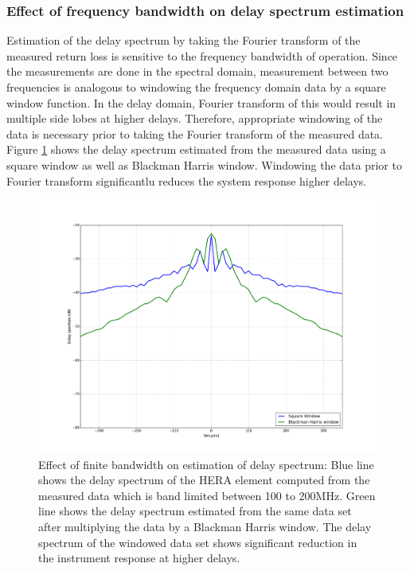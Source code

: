 \documentclass[twocolumn]{emulateapj}
\begin{document}
\subsubsection{Effect of frequency bandwidth on delay spectrum estimation}
Estimation of the delay spectrum by taking the Fourier transform of the measured return loss is sensitive to the frequency bandwidth of operation. Since the measurements are done in the spectral domain, measurement between two frequencies is analogous to windowing the frequency domain data by a square window function. In the delay domain, Fourier transform of this would result in multiple side lobes at higher delays. Therefore, appropriate windowing of the data is  necessary prior to taking the Fourier transform of the measured data. Figure \ref{fig:window} shows the delay spectrum estimated from the measured data using a square window as well as Blackman Harris window. Windowing the data prior to Fourier transform significantlu reduces the system response higher delays.  
\begin{figure}
\centering
\includegraphics[width=\linewidth]{plots/window.png}
\caption{Effect of finite bandwidth on estimation of delay spectrum: Blue line shows the delay spectrum of the HERA element computed from the measured data which is band limited between 100 to 200MHz. Green line shows the delay spectrum estimated from the same data set after multiplying the data by a Blackman Harris window. The delay spectrum of the windowed data set shows significant reduction in the instrument response at higher delays.}
\label{fig:window}
\end{figure} 
\end{document}
